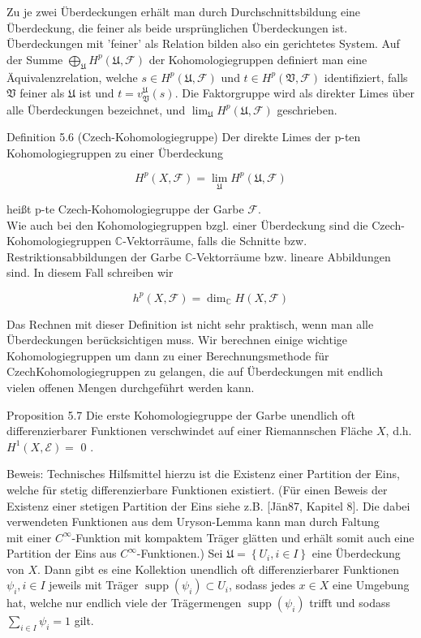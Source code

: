 \documentclass[10pt, letterpaper]{article}
\begin{document}
Zu je zwei Überdeckungen erhält man durch Durchschnittsbildung eine Überdeckung, die feiner als beide ursprünglichen Überdeckungen ist. Überdeckungen mit 'feiner' als Relation bilden also ein gerichtetes System. Auf der Summe $\bigoplus_{\mathfrak{U}} H^{p}(\mathfrak{U}, \mathcal{F})$ der Kohomologiegruppen definiert man eine Äquivalenzrelation, welche $s \in H^{p}(\mathfrak{U}, \mathcal{F})$ und $t \in H^{p}(\mathfrak{V}, \mathcal{F})$ identifiziert, falls $\mathfrak{V}$ feiner als $\mathfrak{U}$ ist und $t=v_{\mathfrak{V}}^{\mathfrak{U}}(s)$. Die Faktorgruppe wird als direkter Limes über alle Überdeckungen bezeichnet, und $\lim _{\mathfrak{U}} H^{p}(\mathfrak{U}, \mathcal{F})$ geschrieben.

Definition 5.6 (Czech-Kohomologiegruppe) Der direkte Limes der p-ten Kohomologiegruppen zu einer Überdeckung

$$
H^{p}(X, \mathcal{F})=\underset{\mathfrak{U}}{\lim } H^{p}(\mathfrak{U}, \mathcal{F})
$$

heißt p-te Czech-Kohomologiegruppe der Garbe $\mathcal{F}$.\\
Wie auch bei den Kohomologiegruppen bzgl. einer Überdeckung sind die Czech-Kohomologiegruppen $\mathbb{C}$-Vektorräume, falls die Schnitte bzw. Restriktionsabbildungen der Garbe $\mathbb{C}$-Vektorräume bzw. lineare Abbildungen sind. In diesem Fall schreiben wir

$$
h^{p}(X, \mathcal{F})=\operatorname{dim}_{\mathbb{C}} H(X, \mathcal{F})
$$

Das Rechnen mit dieser Definition ist nicht sehr praktisch, wenn man alle Überdeckungen berücksichtigen muss. Wir berechnen einige wichtige Kohomologiegruppen um dann zu einer Berechnungsmethode für CzechKohomologiegruppen zu gelangen, die auf Überdeckungen mit endlich vielen offenen Mengen durchgeführt werden kann.

Proposition 5.7 Die erste Kohomologiegruppe der Garbe unendlich oft differenzierbarer Funktionen verschwindet auf einer Riemannschen Fläche $X$, d.h. $H^{1}(X, \mathcal{E})=$ 0 .

Beweis: Technisches Hilfsmittel hierzu ist die Existenz einer Partition der Eins, welche für stetig differenzierbare Funktionen existiert. (Für einen Beweis der Existenz einer stetigen Partition der Eins siehe z.B. [Jän87, Kapitel 8]. Die dabei verwendeten Funktionen aus dem Uryson-Lemma kann man durch Faltung\\
mit einer $C^{\infty}$-Funktion mit kompaktem Träger glätten und erhält somit auch eine Partition der Eins aus $C^{\infty}$-Funktionen.) Sei $\mathfrak{U}=\left\{U_{i}, i \in I\right\}$ eine Überdeckung von $X$. Dann gibt es eine Kollektion unendlich oft differenzierbarer Funktionen $\psi_{i}, i \in I$ jeweils mit Träger $\operatorname{supp}\left(\psi_{i}\right) \subset U_{i}$, sodass jedes $x \in X$ eine Umgebung hat, welche nur endlich viele der Trägermengen $\operatorname{supp}\left(\psi_{i}\right)$ trifft und sodass $\sum_{i \in I} \psi_{i}=1$ gilt.
\end{document}
